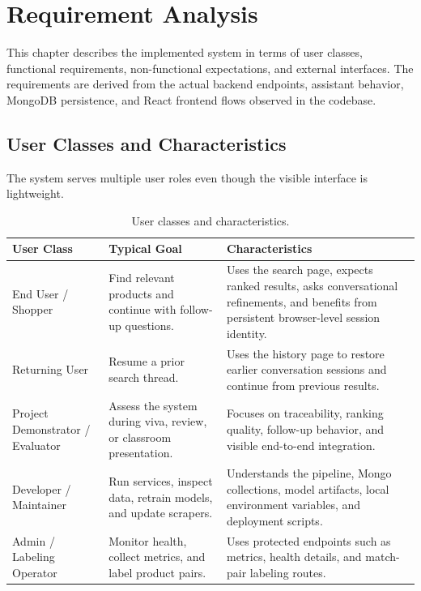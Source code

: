 \documentclass[12pt,a4paper,oneside]{report}
\begin{document}
\chapter{Requirement Analysis}

This chapter describes the implemented system in terms of user classes, functional requirements, non-functional expectations, and external interfaces. The requirements are derived from the actual backend endpoints, assistant behavior, MongoDB persistence, and React frontend flows observed in the codebase.

\section{User Classes and Characteristics}
The system serves multiple user roles even though the visible interface is lightweight.

\begin{table}[H]
\centering
\small
\setlength{\tabcolsep}{4pt}
\renewcommand{\arraystretch}{1.08}
\caption{User classes and characteristics.}
\label{tab:user-classes}
\begin{tabular}{|L{0.18\textwidth}|L{0.21\textwidth}|L{0.43\textwidth}|}
\hline
\textbf{User Class} & \textbf{Typical Goal} & \textbf{Characteristics} \\
\hline
End User / Shopper & Find relevant products and continue with follow-up questions. & Uses the search page, expects ranked results, asks conversational refinements, and benefits from persistent browser-level session identity. \\
\hline
Returning User & Resume a prior search thread. & Uses the history page to restore earlier conversation sessions and continue from previous results. \\
\hline
Project Demonstrator / Evaluator & Assess the system during viva, review, or classroom presentation. & Focuses on traceability, ranking quality, follow-up behavior, and visible end-to-end integration. \\
\hline
Developer / Maintainer & Run services, inspect data, retrain models, and update scrapers. & Understands the pipeline, Mongo collections, model artifacts, local environment variables, and deployment scripts. \\
\hline
Admin / Labeling Operator & Monitor health, collect metrics, and label product pairs. & Uses protected endpoints such as metrics, health details, and match-pair labeling routes. \\
\hline
\end{tabular}
\end{table}
\end{document}
